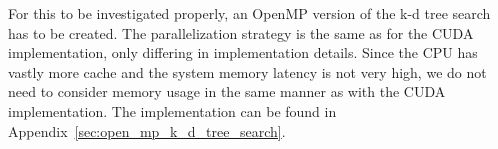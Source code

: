 For this to be investigated properly, an OpenMP version of the k-d tree search has to be created. The parallelization strategy is the same as for the CUDA implementation, only differing in implementation details. Since the CPU has vastly more cache and the system memory latency is not very high, we do not need to consider memory usage in the same manner as with the CUDA implementation. The implementation can be found in Appendix~\ref{sec:open_mp_k_d_tree_search}.
